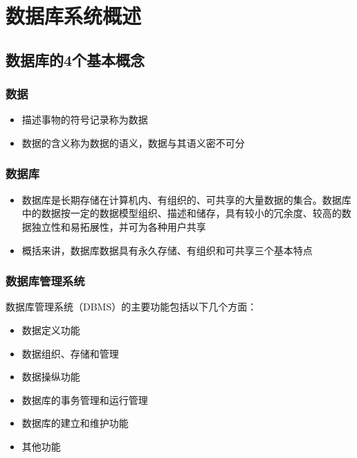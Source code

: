 \section{数据库系统概述}

\subsection{数据库的4个基本概念}

\subsubsection{数据}
\begin{itemize}
    \item 描述事物的符号记录称为数据
    \item 数据的含义称为数据的语义，数据与其语义密不可分
\end{itemize}

\subsubsection{数据库}
\begin{itemize}
    \item 数据库是长期存储在计算机内、有组织的、可共享的大量数据的集合。数据库中的数据按一定的数据模型组织、描述和储存，具有较小的冗余度、较高的数据独立性和易拓展性，并可为各种用户共享
    \item 概括来讲，数据库数据具有永久存储、有组织和可共享三个基本特点
\end{itemize}

\subsubsection{数据库管理系统}
数据库管理系统（DBMS）的主要功能包括以下几个方面：
\vspace{-0.8em}
\begin{multicols}{2}
    \begin{itemize}
        \item 数据定义功能
        \item 数据组织、存储和管理
        \item 数据操纵功能
        \item 数据库的事务管理和运行管理
        \item 数据库的建立和维护功能
        \item 其他功能
    \end{itemize}
\end{multicols}
\vspace{-1em}

